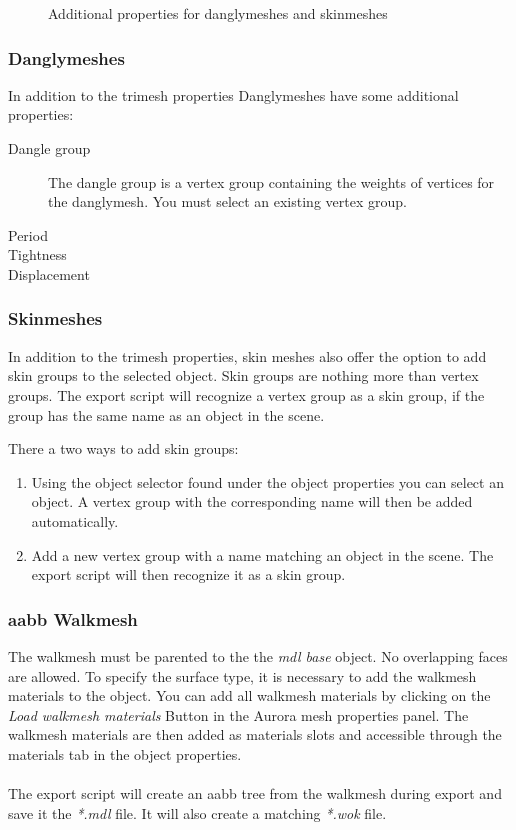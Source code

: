 \documentclass[a4paper]{article}
\begin{document}
\begin{figure}%
  \centering
{}\qquad
{}
\caption[Additional Porperties]{Additional properties for danglymeshes and skinmeshes}%
  \label{fig:addprops}%
\end{figure}

\subsubsection{Danglymeshes}
In addition to the trimesh properties Danglymeshes have some additional properties:
\begin{description}
    \item[Dangle group] The dangle group is a vertex group containing the weights of vertices for the danglymesh. You must select an existing vertex group.
    \item[Period] 
    \item[Tightness]
    \item[Displacement] 
\end{description}

\subsubsection{Skinmeshes}
In addition to the trimesh properties, skin meshes also offer the option to add skin groups to the selected object. Skin groups are nothing more than vertex groups. The export script will recognize a vertex group as a skin group, if the group has the same name as an object in the scene.

There a two ways to add skin groups:
\begin{enumerate}
  \item Using the object selector found under the object properties you can select an object. A vertex group with the corresponding name will then be added automatically.
  \item Add a new vertex group with a name matching an object in the scene. The export script will then recognize it as a skin group.
\end{enumerate}

\subsubsection{aabb Walkmesh}
The walkmesh must be parented to the the {\itshape{mdl base}} object. No overlapping faces are allowed. To specify the surface type, it is necessary to add the walkmesh materials to the object. You can add all walkmesh materials by clicking on the {\itshape{Load walkmesh materials}} Button in the Aurora mesh properties panel. The walkmesh materials are then added as materials slots and accessible through the materials tab in the object properties. \\ \\
The export script will create an aabb tree from the walkmesh during export and save it the {\itshape{*.mdl}} file. It will also create a matching {\itshape{*.wok}} file.
\end{document}
